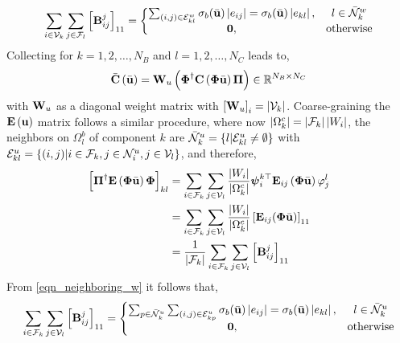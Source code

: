 \begin{tcolorbox}[enhanced,breakable,title=Coarse-Grained Thermal Conductivity Matrices]
    \begin{equation}
        \sum_{i\in\mathcal{V}_k}\sum_{j\in\mathcal{F}_l}\left[\mathbf{B}_{ij}^{j}\right]_{11} = \left\{\begin{matrix}
            \sum_{(i,j)\in\mathcal{E}^{w}_{kl}}\sigma_b(\bar{\mathbf{u}})\left|e_{ij}\right| = \sigma_b(\bar{\mathbf{u}})\left|e_{kl}\right|, & l\in\bar{\mathcal{N}}^{w}_k \\
            \mathbf{0}, & \text{otherwise}
        \end{matrix}\right.\label{eqn_neighboring_w}
    \end{equation}
    Collecting for $k=1,2,\dots,N_B$ and $l=1,2,\dots,N_C$ leads to,
    \begin{equation}
        \bar{\mathbf{C}}\left(\bar{\mathbf{u}}\right) = \mathbf{W}_u\left(\boldsymbol{\Phi}^{\dagger}\mathbf{C}\left(\boldsymbol{\Phi}\bar{\mathbf{u}}\right)\boldsymbol{\Pi}\right)\in\mathbb{R}^{N_B\times N_C}
    \end{equation}
    with $\mathbf{W}_u$ as a diagonal weight matrix with $\left[\mathbf{W}_u\right]_i = \left|\mathcal{V}_k\right|$. Coarse-graining the $\mathbf{E}\left(\mathbf{u}\right)$ matrix follows a similar procedure, where now $\left|\Omega_k^c\right|=\left|\mathcal{F}_k\right|\left|W_i\right|$, the neighbors on $\Omega_l^b$ of component $k$ are $\bar{\mathcal{N}}_k^u=\left\{l | \mathcal{E}_{kl}^{u}\neq\emptyset\right\}$ with $\mathcal{E}_{kl}^{u}=\left\{(i,j)| i\in\mathcal{F}_k, j\in\mathcal{N}_i^u, j\in\mathcal{V}_l\right\}$, and therefore,
    \begin{subequations}
        \begin{align}
            \left[\boldsymbol{\Pi}^{\dagger}\mathbf{E}\left(\boldsymbol{\Phi}\bar{\mathbf{u}}\right)\boldsymbol{\Phi}\right]_{kl} &= \sum_{i\in\mathcal{F}_k}\sum_{j\in\mathcal{V}_l}\frac{\left|W_i\right|}{\left|\Omega_k^c\right|}\boldsymbol{\psi}_i^{k\top}\mathbf{E}_{ij}\left(\boldsymbol{\Phi}\bar{\mathbf{u}}\right)\varphi_j^l\\
            &= \sum_{i\in\mathcal{F}_k}\sum_{j\in\mathcal{V}_l}\frac{\left|W_i\right|}{\left|\Omega_k^c\right|}\left[\mathbf{E}_{ij}(\boldsymbol{\Phi}\bar{\mathbf{u}})\right]_{11}\\
            &= \frac{1}{\left|\mathcal{F}_k\right|}\sum_{i\in\mathcal{F}_k}\sum_{j\in\mathcal{V}_l}\left[\mathbf{B}_{ij}^{j}\right]_{11}
        \end{align}
    \end{subequations}
    From \cref{eqn_neighboring_w} it follows that,
    \begin{equation}
        \sum_{i\in\cF_k}\sum_{j\in\cV_l}\left[\vB_{ij}^{j}\right]_{11} = \left\{\begin{matrix}
            \sum_{p\in\bar{\cN}_k^u}\sum_{(i,j)\in\cE^{u}_{kp}}\sigma_b(\bvu)\left|e_{ij}\right| = \sigma_b(\bvu)\left|e_{kl}\right|, & l\in\bar{\cN}^{u}_k \\
            \vzero, & \text{otherwise}
        \end{matrix}\right.

\end{equation}
\end{tcolorbox}
